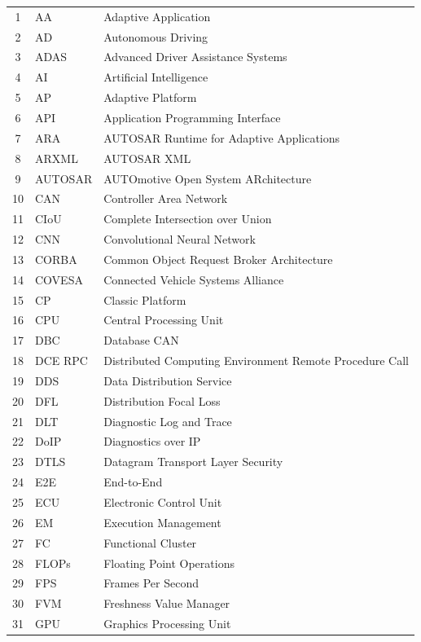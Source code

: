 \begin{longtable}{|c|l|l|}
    1 & AA & Adaptive Application \\
    2 & AD & Autonomous Driving \\
    3 & ADAS & Advanced Driver Assistance Systems \\
    4 & AI & Artificial Intelligence \\
    5 & AP & Adaptive Platform \\
    6 & API & Application Programming Interface \\
    7 & ARA & AUTOSAR Runtime for Adaptive Applications \\
    8 & ARXML & AUTOSAR XML \\
    9 & AUTOSAR & AUTOmotive Open System ARchitecture \\
    10 & CAN & Controller Area Network \\
    11 & CIoU & Complete Intersection over Union \\
    12 & CNN & Convolutional Neural Network \\
    13 & CORBA & Common Object Request Broker Architecture \\
    14 & COVESA & Connected Vehicle Systems Alliance \\
    15 & CP & Classic Platform \\
    16 & CPU & Central Processing Unit \\
    17 & DBC & Database CAN \\
    18 & DCE RPC & Distributed Computing Environment Remote Procedure Call \\
    19 & DDS & Data Distribution Service \\
    20 & DFL & Distribution Focal Loss \\
    21 & DLT & Diagnostic Log and Trace \\
    22 & DoIP & Diagnostics over IP \\
    23 & DTLS & Datagram Transport Layer Security \\
    24 & E2E & End-to-End \\
    25 & ECU & Electronic Control Unit \\
    26 & EM & Execution Management \\
    27 & FC & Functional Cluster \\
    28 & FLOPs & Floating Point Operations \\
    29 & FPS & Frames Per Second \\
    30 & FVM & Freshness Value Manager \\
    31 & GPU & Graphics Processing Unit \\

\end{longtable}
